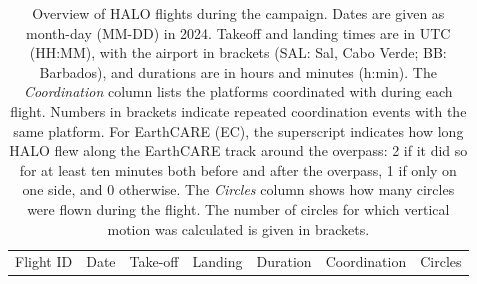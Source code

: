 \begin{table}
\caption{Overview of HALO flights during the campaign. Dates are given as month-day (MM-DD) in 2024. Takeoff and landing times are in UTC (HH:MM), with the airport in brackets (SAL: Sal, Cabo Verde; BB: Barbados), and durations are in hours and minutes (h:min). The \textit{Coordination} column lists the platforms coordinated with during each flight. Numbers in brackets indicate repeated coordination events with the same platform. For EarthCARE (EC), the superscript indicates how long HALO flew along the EarthCARE track around the overpass: 2 if it did so for at least ten minutes both before and after the overpass, 1 if only on one side, and 0 otherwise. The \textit{Circles} column shows how many circles were flown during the flight. The number of circles for which vertical motion was calculated is given in brackets.}
\label{tab:flights}
\begin{tabular}{lllllll}

Flight ID & Date & Take-off & Landing & Duration & Coordination & Circles \\


\end{tabular}
\end{table}
